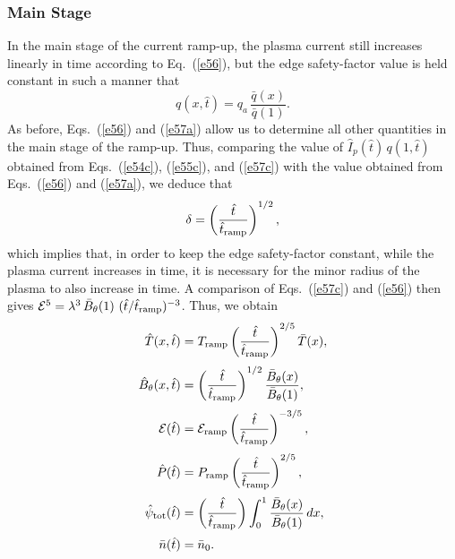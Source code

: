 \documentclass{iopjournal}
\begin{document}
\subsubsection{Main Stage}\label{main}
In the main stage of the current ramp-up, the plasma current still increases linearly in time according to Eq.~(\ref{e56}), but the edge safety-factor value
is held constant in such a manner that 
\begin{equation}\label{e57a}
q(x,\hat{t}) = q_a\,\frac{\bar{q}(x)}{\bar{q}(1)}.
\end{equation}
As before, Eqs.~(\ref{e56}) and (\ref{e57a}) allow us to determine all other quantities in the main 
stage of the ramp-up. Thus, comparing the value of $\hat{I}_p(\hat{t})\,q(1,\hat{t})$ obtained from Eqs.~(\ref{e54c}), (\ref{e55c}), and (\ref{e57c})
with the value obtained from Eqs.~(\ref{e56}) and (\ref{e57a}), we deduce that 
\begin{equation}
\delta = \left(\frac{\hat{t}}{\hat{t}_{\rm ramp}}\right)^{1/2},\label{e70}
\end{equation}
which implies that, in order to keep the edge safety-factor constant, while the plasma current increases in time, it
is necessary for the minor radius of the plasma to also increase in time. A comparison of
Eqs.~(\ref{e57c}) and (\ref{e56}) then gives  ${\cal E}^5 = \lambda^3\,\bar{B}_\theta(1)\,\,(\hat{t}/\hat{t}_{\rm ramp})^{-3}$. 
Thus, we obtain
\begin{align}
\hat{T}(x,\hat{t}) &= T_{\rm ramp}\left(\frac{\hat{t}}{\hat{t}_{\rm ramp}}\right)^{2/5}\bar{T}(x),\\[0.5ex]
\hat{B}_\theta(x,\hat{t})&= \left(\frac{\hat{t}}{\hat{t}_{\rm ramp}}\right)^{1/2}\frac{\bar{B}_\theta(x)}{\bar{B}_\theta(1)},\\[0.5ex]
{\cal E}(\hat{t}) &= {\cal E}_{\rm ramp}\left(\frac{\hat{t}}{\hat{t}_{\rm ramp}}\right)^{-3/5},\\[0.5ex]
\hat{P}(\hat{t}) &= P_{\rm ramp}\left(\frac{\hat{t}}{\hat{t}_{\rm ramp}}\right)^{2/5},\\[0.5ex]
\hat{\psi}_{\rm tot}(\hat{t})&= \left(\frac{\hat{t}}{\hat{t}_{\rm ramp}}\right)\int_0^1\frac{\bar{B}_{\theta}(x)}{\bar{B}_\theta(1)}\,dx,\\[0.5ex]
\bar{n}(\hat{t}) & = \bar{n}_0.
\end{align}
\end{document}
